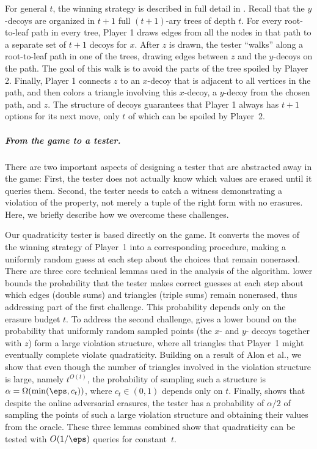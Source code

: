 \documentclass[11pt]{article}
\numberwithin{equation}{section}
\theoremstyle{definition}
\theoremstyle{plain}
\begin{document}
For general $t$, the winning strategy is described in full detail in . Recall that the $y$-decoys are organized in $t+1$ full $(t+1)$-ary trees of depth $t$. For every root-to-leaf path in every tree, Player 1 draws edges from all the nodes in that path to a separate set of $t+1$ decoys for $x$. After $z$ is drawn, the tester ``walks'' along a root-to-leaf path in one of the trees, drawing edges between $z$ and the $y$-decoys on the path. The goal of this walk is to avoid the parts of the tree spoiled by Player 2. Finally, Player 1 connects $z$ to an $x$-decoy that is adjacent to all vertices in the path, and then colors a triangle involving this $x$-decoy, a $y$-decoy from the chosen path, and $z$. The structure of decoys guarantees that Player 1 always has $t+1$ options for its next move, only $t$ of which can be spoiled by Player~2.


\subparagraph*{From the game to a tester.}
There are two important aspects of designing a tester that are abstracted away in the game: First, the tester does not actually know which values are erased until it queries them. Second, the tester needs to catch a witness demonstrating a violation of the property, not merely a tuple of the right form with no erasures. Here, we briefly describe how we overcome these challenges.


  Our quadraticity tester is based directly on the game. It converts the moves of the winning strategy of Player~1 into a corresponding procedure, making a uniformly random guess at each step about the choices that remain nonerased. There are three core technical lemmas used in the analysis of the algorithm.  lower bounds the probability that the tester makes correct guesses at each step about which edges (double sums) and triangles (triple sums) remain nonerased, thus addressing part of the first challenge. This probability depends only on the erasure budget $t$. To address the second challenge,  gives a lower bound on the probability that uniformly random sampled points (the $x$- and $y$- decoys together with $z$) form a large violation structure, where all triangles that Player~1 might eventually complete violate quadraticity. Building on a result of Alon et al., we show that even though the number of triangles involved in the violation structure is large, namely $ t^{O(t)}$, the probability of sampling such a structure is $\alpha = \Omega(\min(\eps, c_t))$, where $c_t \in(0,1)$ depends only on $t$. Finally,  shows that despite the online adversarial erasures, the tester has a probability of $\alpha/2$ of sampling the points of such a large violation structure and obtaining their values from the oracle. These three lemmas combined show that quadraticity can be tested with $O(1/\eps)$ queries for constant~$t$.   
\end{document}
